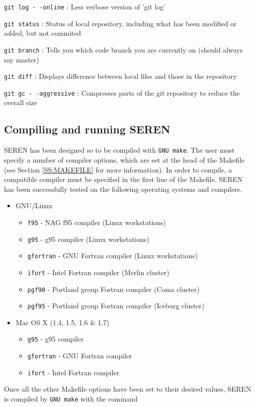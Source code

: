 \documentclass[a4paper]{article}
\newcommand{\var}[1]{\texttt{#1}}
\begin{document}
\var{git log -\,-online}  : Less verbose version of 'git log'

\var{git status}        : Status of local repository, including what has been
                          modified or added, but not commited

\var{git branch}        : Tells you which code branch you are currently on
                         (should always say master)

\var{git diff}          : Displays difference between local files and those in
                          the repository

\var{git gc -\,-aggressive} : Compresses parts of the git repository to reduce the overall size





\subsection{Compiling and running SEREN}
SEREN has been designed so to be compiled with \var{GNU make}.  
The user must specify a number of compiler options, which are set at the 
head of the Makefile (see Section \ref{SS:MAKEFILE} for more information). 
In order to compile, a compatible compiler must be specified in the 
first line of the Makefile.  
SEREN has been successfully tested on the following operating systems 
and compilers.  
\begin{itemize}
\item GNU/Linux
\begin{itemize}
\item \var{f95}      - NAG f95 compiler (Linux workstations)
\item \var{g95}      - g95 compiler (Linux workstations)
\item \var{gfortran} - GNU Fortran compiler (Linux workstations)
\item \var{ifort}    - Intel Fortran compiler (Merlin cluster)
\item \var{pgf90}    - Portland group Fortran compiler (Coma cluster)
\item \var{pgf95}    - Portland group Fortran compiler (Iceburg cluster)
\end{itemize}
\item Mac OS X (1.4, 1.5, 1.6 \& 1.7)
\begin{itemize}
\item \var{g95}      - g95 compiler
\item \var{gfortran} - GNU Fortran compiler
\item \var{ifort}    - Intel Fortran compiler
\end{itemize}
\end{itemize}
Once all the other Makefile options have been set to their desired values, SEREN is compiled by \var{GNU make} with the command \newline
\end{document}
